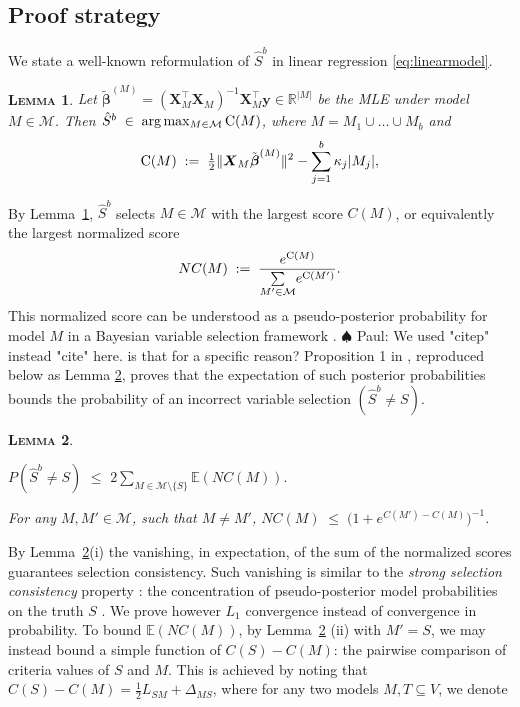 \documentclass[aos]{imsart}
\theoremstyle{plain}
\newtheorem{lem}{\textsc{Lemma}}[section]
\newcommand{\paul}[1]{{\small{\color{green} \sf $\spadesuit$ Paul: #1}}}
\newcommand{\E}{\mathbb{E}}
\newcommand{\R}{\mathbb{R}}
\newcommand{\M}{\mathcal{M}}
\newcommand{\bs}{\boldsymbol}
\begin{document}
\subsection{Proof strategy}
\label{ssec:regression_proof_strategy}


We state a well-known
reformulation of $\hat S^b$ in linear regression \eqref{eq:linearmodel}. 
\begin{lem}\label{lem:useful-reformulation} Let $\tilde{\bs \beta}^{(M)}= (\bs X_{\!\!M}^\top \bs X_{\!\!M})^{-1}\bs X_{\!\!M}^\top\bs y \in \R^{|M|}$ be the MLE under model $M\in \M$. Then $\hat S^b\;\in\;\arg\max_{M\in \M} {\rm C}(M)$, where $M=M_1\cup \ldots\cup M_b$ and
\begin{equation}\label{eq:CM}
    {\rm C}(M)\;: =\;\tfrac{1}{2}\|\bs X_M\tilde{\bs\beta}^{(M)}\|^2-\sum_{j=1}^b\kappa_j |M_j|,
\end{equation}
\end{lem}
By Lemma~\ref{lem:useful-reformulation}, $\hat S^b$ selects %
$M\in \M$ with the largest score $C(M)$, or equivalently the largest normalized score
\begin{equation}\label{eq:normalizedscore}
    NC(M)\;:=\;\frac{e^{{\rm C}(M)}}{\underset{M' \in \M}{\sum} e^{{\rm C}(M')}}.
\end{equation}
This normalized score can be understood as a pseudo-posterior probability for model $M$ in a Bayesian variable selection framework \citep{BIC}. \paul{We used "citep" instead "cite" here. is that for a specific reason?}
Proposition 1 in \cite{rossell2022concentration}, reproduced below as Lemma \ref{lem:L0toL1convergence}, proves that the expectation of such posterior probabilities bounds the probability of an incorrect variable selection $(\hat S^b\neq S)$. 

\begin{lem}\label{lem:L0toL1convergence}
\begin{longlist}
\item 
$P(\hat{S}^{b} \neq S) \,\,\leq \,\, 2 \sum_{M \in \M\setminus \{S\}} \E\left(NC(M)\right).$
\item  For any $M,M'\in\M$, such that $M\neq M'$, 
$NC(M)\;\leq \;\big(1+e^{C(M')-C(M)}\big)^{-1}$.
\end{longlist}
\end{lem}
By Lemma~\ref{lem:L0toL1convergence}(i) the vanishing, in expectation, of the sum of the normalized scores 
guarantees selection consistency. Such vanishing is similar to the \textit{strong selection consistency} property \citep{narisettyhe2014}: the concentration of pseudo-posterior model probabilities on the truth $S$ . We prove however $L_1$ convergence instead of convergence in probability.
To bound $\E(NC(M))$, by Lemma~\ref{lem:L0toL1convergence} (ii) with $M'=S$, we may instead bound a simple function of $C(S)-C(M)$: the pairwise comparison of criteria values of $S$ and $M$. 
This is achieved by noting that $C(S)-C(M)=\tfrac12 L_{SM}+\Delta_{MS}$, where for any two models $M,T\subseteq V$, we denote
\end{document}
